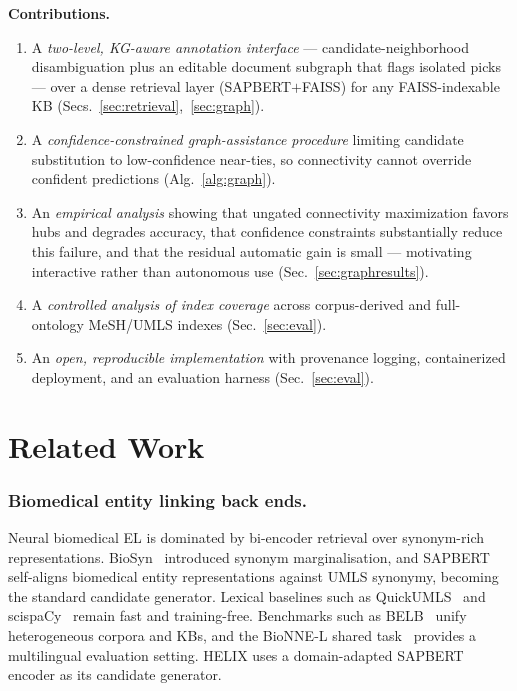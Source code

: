 \documentclass[runningheads]{llncs}
\begin{document}
\medskip\noindent\textbf{Contributions.}
\begin{enumerate}
  \item A \emph{two-level, KG-aware annotation interface} --- candidate-neighborhood
        disambiguation plus an editable document subgraph that flags isolated picks
        --- over a dense retrieval layer (SAPBERT$+$FAISS) for any FAISS-indexable
        KB (Secs.~\ref{sec:retrieval},~\ref{sec:graph}).
  \item A \emph{confidence-constrained graph-assistance procedure} limiting candidate
        substitution to low-confidence near-ties, so connectivity cannot override
        confident predictions (Alg.~\ref{alg:graph}).
  \item An \emph{empirical analysis} showing that ungated connectivity maximization
        favors hubs and degrades accuracy, that confidence constraints substantially
        reduce this failure, and that the residual automatic gain is small ---
        motivating interactive rather than autonomous use
        (Sec.~\ref{sec:graphresults}).
  \item A \emph{controlled analysis of index coverage} across corpus-derived and
        full-ontology MeSH/UMLS indexes (Sec.~\ref{sec:eval}).
  \item An \emph{open, reproducible implementation} with provenance logging,
        containerized deployment, and an evaluation harness (Sec.~\ref{sec:eval}).
\end{enumerate}

\section{Related Work}
\label{sec:related}

\subsubsection{Biomedical entity linking back ends.}
Neural biomedical EL is dominated by bi-encoder retrieval over synonym-rich
representations. BioSyn~\cite{biosyn} introduced synonym marginalisation, and
SAPBERT~\cite{sapbert} self-aligns biomedical entity representations against UMLS
synonymy, becoming the standard candidate generator. Lexical baselines such as
QuickUMLS~\cite{quickumls} and scispaCy~\cite{scispacy} remain fast and
training-free. Benchmarks such as BELB~\cite{belb} unify heterogeneous corpora and
KBs, and the BioNNE-L shared task~\cite{bionne} provides a multilingual evaluation
setting. HELIX uses a domain-adapted SAPBERT encoder as its candidate generator.
\end{document}
